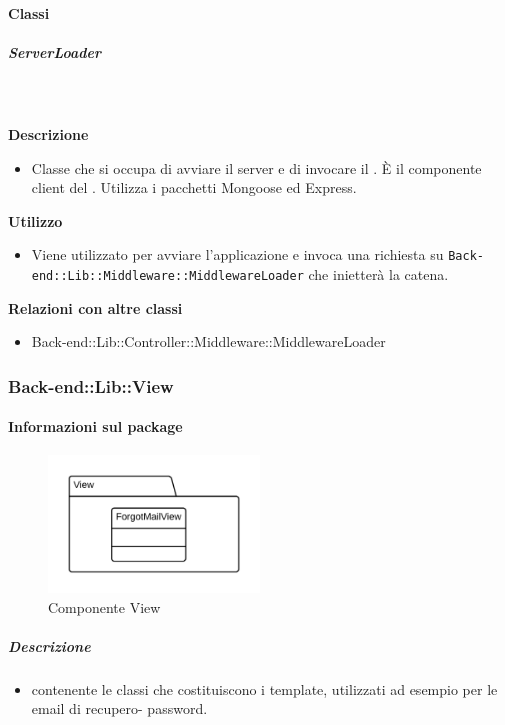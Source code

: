 		\paragraph{Classi}
			\subparagraph{ServerLoader}
				
				\textbf{\\ \\ Descrizione} 
					\begin{itemize}
						\item[] Classe che si occupa di avviare il server e di invocare il . È il componente client del  . Utilizza i pacchetti Mongoose ed Express.
					\end{itemize}      
				\textbf{Utilizzo}  
					\begin{itemize}
						\item[] Viene utilizzato per avviare l'applicazione e invoca una richiesta su \texttt{Back-end::Lib::Middleware::MiddlewareLoader} che inietterà la catena.
					\end{itemize}
					\textbf{Relazioni con altre classi}
					\begin{itemize}
							\item{Back-end::Lib::Controller::Middleware::MiddlewareLoader}
					\end{itemize}
	\subsubsection{Back-end::Lib::View}
	\paragraph{Informazioni sul package} 
		\begin{figure}[H] 
			\begin{center} 
				\includegraphics[width=0.5\textwidth]{uml/package/Back-end::Lib::View.png}  
				\caption{Componente View}
			\end{center}  
		\end{figure} 
	\subparagraph{Descrizione} 
		\begin{itemize}
		\item[]  contenente le classi che costituiscono i template, utilizzati ad esempio per le email di recupero-
password.

		\end{itemize} 
